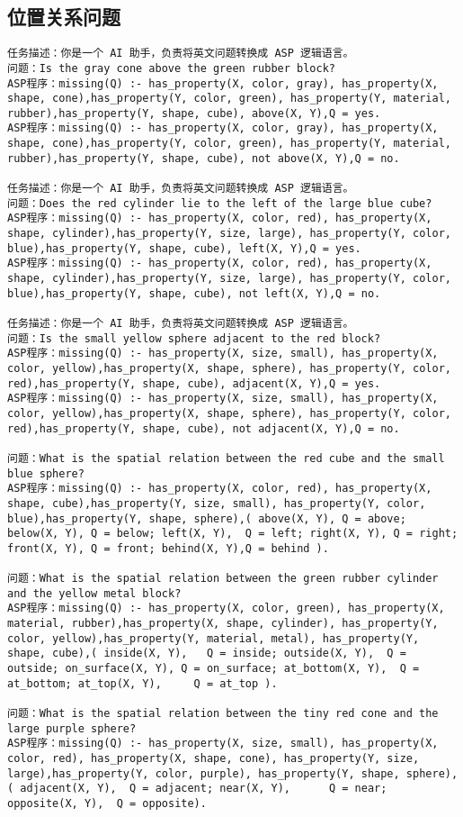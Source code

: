 \subsection{位置关系问题}
\begin{lstlisting}
任务描述：你是一个 AI 助手，负责将英文问题转换成 ASP 逻辑语言。
问题：Is the gray cone above the green rubber block?
ASP程序：missing(Q) :- has_property(X, color, gray), has_property(X, shape, cone),has_property(Y, color, green), has_property(Y, material, rubber),has_property(Y, shape, cube), above(X, Y),Q = yes.
ASP程序：missing(Q) :- has_property(X, color, gray), has_property(X, shape, cone),has_property(Y, color, green), has_property(Y, material, rubber),has_property(Y, shape, cube), not above(X, Y),Q = no.

任务描述：你是一个 AI 助手，负责将英文问题转换成 ASP 逻辑语言。
问题：Does the red cylinder lie to the left of the large blue cube?
ASP程序：missing(Q) :- has_property(X, color, red), has_property(X, shape, cylinder),has_property(Y, size, large), has_property(Y, color, blue),has_property(Y, shape, cube), left(X, Y),Q = yes.
ASP程序：missing(Q) :- has_property(X, color, red), has_property(X, shape, cylinder),has_property(Y, size, large), has_property(Y, color, blue),has_property(Y, shape, cube), not left(X, Y),Q = no.

任务描述：你是一个 AI 助手，负责将英文问题转换成 ASP 逻辑语言。
问题：Is the small yellow sphere adjacent to the red block?
ASP程序：missing(Q) :- has_property(X, size, small), has_property(X, color, yellow),has_property(X, shape, sphere), has_property(Y, color, red),has_property(Y, shape, cube), adjacent(X, Y),Q = yes.
ASP程序：missing(Q) :- has_property(X, size, small), has_property(X, color, yellow),has_property(X, shape, sphere), has_property(Y, color, red),has_property(Y, shape, cube), not adjacent(X, Y),Q = no.

问题：What is the spatial relation between the red cube and the small blue sphere?
ASP程序：missing(Q) :- has_property(X, color, red), has_property(X, shape, cube),has_property(Y, size, small), has_property(Y, color, blue),has_property(Y, shape, sphere),( above(X, Y), Q = above; below(X, Y), Q = below; left(X, Y),  Q = left; right(X, Y), Q = right; front(X, Y), Q = front; behind(X, Y),Q = behind ).

问题：What is the spatial relation between the green rubber cylinder and the yellow metal block?
ASP程序：missing(Q) :- has_property(X, color, green), has_property(X, material, rubber),has_property(X, shape, cylinder), has_property(Y, color, yellow),has_property(Y, material, metal), has_property(Y, shape, cube),( inside(X, Y),   Q = inside; outside(X, Y),  Q = outside; on_surface(X, Y), Q = on_surface; at_bottom(X, Y),  Q = at_bottom; at_top(X, Y),     Q = at_top ).

问题：What is the spatial relation between the tiny red cone and the large purple sphere?
ASP程序：missing(Q) :- has_property(X, size, small), has_property(X, color, red), has_property(X, shape, cone), has_property(Y, size, large),has_property(Y, color, purple), has_property(Y, shape, sphere),( adjacent(X, Y),  Q = adjacent; near(X, Y),      Q = near; opposite(X, Y),  Q = opposite).
\end{lstlisting}
